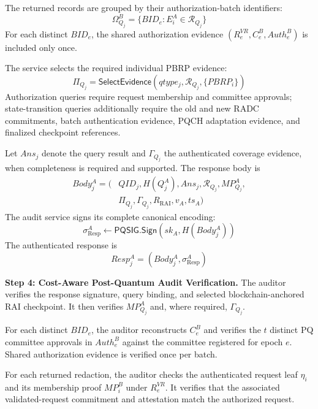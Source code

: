 \documentclass[lettersize,journal]{IEEEtran}
\begin{document}
The returned records are grouped by
their authorization-batch identifiers:
\begin{equation}
\Omega_{Q_j}^B=
\{BID_e:E_i^A\in\mathcal{R}_{Q_j}\}
\end{equation}
For each distinct $BID_e$, the shared
authorization evidence
$(R_e^{VR},C_e^B,Auth_e^B)$ is included
only once.

The service selects the required
individual PBRP evidence:
\begin{equation}
\Pi_{Q_j}=
\mathsf{SelectEvidence}
(qtype_j,\mathcal{R}_{Q_j},
\{PBRP_i\})
\end{equation}
Authorization queries require request
membership and committee approvals;
state-transition queries additionally
require the old and new RADC commitments,
batch authentication evidence, PQCH
adaptation evidence, and finalized
checkpoint references.

Let $Ans_j$ denote the query result and
$\Gamma_{Q_j}$ the authenticated coverage
evidence, when completeness is required
and supported. The response body is
\begin{equation}
\begin{aligned}
Body_j^A=\big(
&QID_j,H(Q_j^A),Ans_j,
\mathcal{R}_{Q_j},MP_{Q_j}^A,\\
&\Pi_{Q_j},
\Gamma_{Q_j},R_{\mathrm{RAI}},v_A,ts_A\big)
\end{aligned}
\end{equation}
The audit service signs its complete
canonical encoding:
\begin{equation}
\sigma_{\mathrm{Resp}}^A
\leftarrow
\mathsf{PQSIG.Sign}
(sk_A,H(Body_j^A))
\end{equation}
The authenticated response is
\begin{equation}
Resp_j^A=
(Body_j^A,\sigma_{\mathrm{Resp}}^A)
\end{equation}

\medskip
\noindent\textbf{Step 4: Cost-Aware
Post-Quantum Audit Verification.}
The auditor verifies the response
signature, query binding, and selected
blockchain-anchored RAI checkpoint.
It then verifies $MP_{Q_j}^A$ and,
where required, $\Gamma_{Q_j}$.

For each distinct $BID_e$, the auditor
reconstructs $C_e^B$ and verifies
the $t$ distinct PQ committee approvals
in $Auth_e^B$ against the committee
registered for epoch $e$. Shared
authorization evidence is verified
once per batch.

For each returned redaction, the auditor
checks the authenticated request leaf
$\eta_i$ and its membership proof
$MP_i^B$ under $R_e^{VR}$. It verifies
that the associated validated-request
commitment and attestation match the
authorized request.
\end{document}
